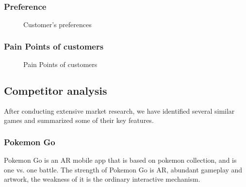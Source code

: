 \documentclass[UTF8,a4paper,12pt]{ctexart}
\numberwithin{equation}{section}
\begin{document}
\subsubsection*{Preference}
\begin{figure}[htb] 
\caption{Customer's preferences}
\end{figure}
\subsubsection*{Pain Points of customers}
\begin{figure}[htbp] 
\caption{Pain Points of customers}
\end{figure}

\subsection{Competitor analysis}
After conducting extensive market research, we have identified several similar games and summarized some of their key features.
\subsubsection*{Pokemon Go}
Pokemon Go is an AR mobile app that is based on pokemon collection, and is one vs. one battle. The strength of Pokemon Go is AR, abundant gameplay and artwork, the weakness of it is the ordinary interactive mechanism.
\end{document}
